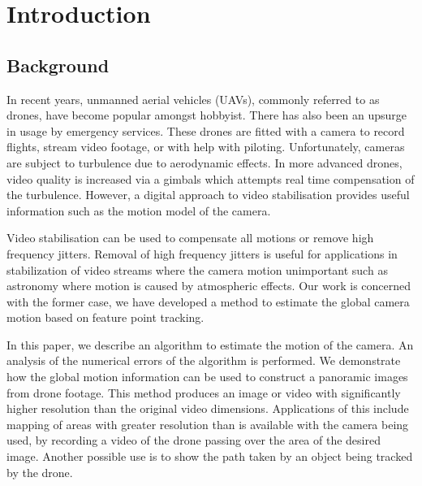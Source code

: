 \section{Introduction}
\subsection{Background}
In recent years, unmanned aerial vehicles (UAVs),
commonly referred to as drones,
have become popular amongst hobbyist.
There has also been an upsurge in usage by emergency services.
These drones are fitted with a camera to record flights, stream video footage, or with help with piloting.
Unfortunately, cameras are subject to turbulence due to aerodynamic effects. 
In more advanced drones, video quality is increased via a gimbals which attempts real time compensation of the turbulence.
However, a digital approach to video stabilisation provides useful information such as the motion model of the camera.

Video stabilisation can be used to compensate all motions or remove high frequency jitters.
Removal of high frequency jitters is useful for applications in stabilization of video streams
where the camera motion unimportant such as astronomy where motion is caused by atmospheric effects. 
Our work is concerned with the former case,
we have developed a method to estimate the global camera motion based on feature point tracking.

In this paper, we describe an algorithm to estimate the motion of the camera.
An analysis of the numerical errors of the algorithm is performed.
We demonstrate how the global motion information can be used to construct a panoramic images from drone footage.
This method produces an image or video with significantly higher resolution than the original video dimensions. 
Applications of this include mapping of areas with greater resolution than is available with the camera being used, by recording a video of the drone passing over the area of the desired image.
Another possible use is to show the path taken by an object being tracked by the drone.

